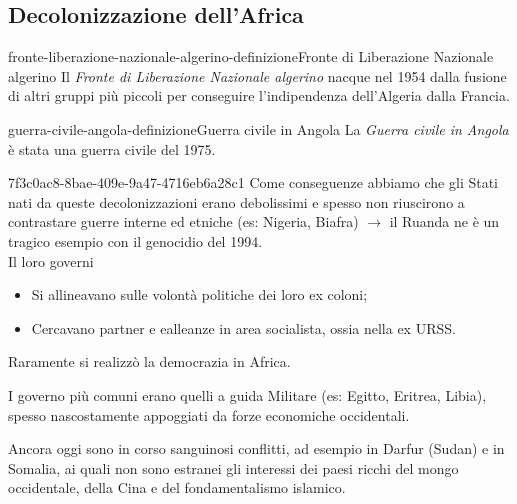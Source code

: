 \documentclass[preview]{standalone}
\begin{document}
\subsection{Decolonizzazione dell'Africa}


\begin{snippetdefinition}{fronte-liberazione-nazionale-algerino-definizione}{Fronte di Liberazione Nazionale algerino}
    Il \textit{Fronte di Liberazione Nazionale algerino}
    nacque nel 1954 dalla fusione di altri gruppi più piccoli per conseguire l'indipendenza
    dell'Algeria dalla Francia. 
\end{snippetdefinition}


\begin{snippetdefinition}{guerra-civile-angola-definizione}{Guerra civile in Angola}
    La \textit{Guerra civile in Angola} è stata una guerra civile del 1975.
\end{snippetdefinition}

\begin{snippet}{7f3c0ac8-8bae-409e-9a47-4716eb6a28c1}
    Come conseguenze abbiamo che gli Stati nati da queste decolonizzazioni
    erano debolissimi e spesso non riuscirono a
    contrastare guerre interne ed etniche (es: Nigeria, Biafra)
    \(\rightarrow\) il Ruanda ne è un tragico esempio con il genocidio del 1994.
    \\
    Il loro governi
    \begin{itemize}
        \item Si allineavano sulle volontà politiche dei loro ex coloni;
        \item Cercavano partner e ealleanze in area socialista, ossia nella ex URSS.
    \end{itemize}
    Raramente si realizzò la democrazia in Africa.

    I governo più comuni erano quelli a guida Militare (es: Egitto, Eritrea, Libia),
    spesso nascostamente appoggiati da forze economiche occidentali.

    Ancora oggi sono in corso sanguinosi conflitti, ad esempio in Darfur (Sudan)
    e in Somalia, ai quali non sono estranei gli interessi dei paesi ricchi del mongo
    occidentale, della Cina e del fondamentalismo islamico.
\end{snippet}
\end{document}
